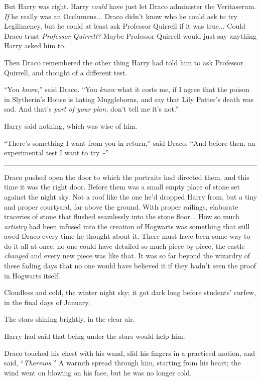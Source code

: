 But Harry was right. Harry \emph{could} have just let Draco administer the Veritaserum. \emph{If} he really was an Occlumens... Draco didn't know who he could ask to try Legilimency, but he could at least ask Professor Quirrell if it was true... Could Draco trust \emph{Professor Quirrell?} Maybe Professor Quirrell would just say anything Harry asked him to.

Then Draco remembered the other thing Harry had told him to ask Professor Quirrell, and thought of a different test.

``You \emph{know},'' said Draco. ``You \emph{know} what it costs me, if I agree that the poison in Slytherin's House is hating Muggleborns, and say that Lily Potter's death was sad. And that's \emph{part of your plan,} don't tell me it's not.''

Harry said nothing, which was wise of him.

``There's something I want from you in return,'' said Draco. ``And before then, an experimental test I want to try~-''

\begin{center}\rule{3in}{0.4pt}\end{center}

Draco pushed open the door to which the portraits had directed them, and this time it was the right door. Before them was a small empty place of stone set against the night sky. Not a roof like the one he'd dropped Harry from, but a tiny and proper courtyard, far above the ground. With proper railings, elaborate traceries of stone that flushed seamlessly into the stone floor... How so much \emph{artistry} had been infused into the creation of Hogwarts was something that still awed Draco every time he thought about it. There must have been some way to do it all at once, no one could have detailed so much piece by piece, the castle \emph{changed} and every new piece was like that. It was so far beyond the wizardry of these fading days that no one would have believed it if they hadn't seen the proof in Hogwarts itself.

Cloudless and cold, the winter night sky; it got dark long before students' curfew, in the final days of January.

The stars shining brightly, in the clear air.

Harry had said that being under the stars would help him.

Draco touched his chest with his wand, slid his fingers in a practiced motion, and said, ``\emph{Thermos.}'' A warmth spread through him, starting from his heart; the wind went on blowing on his face, but he was no longer cold.

